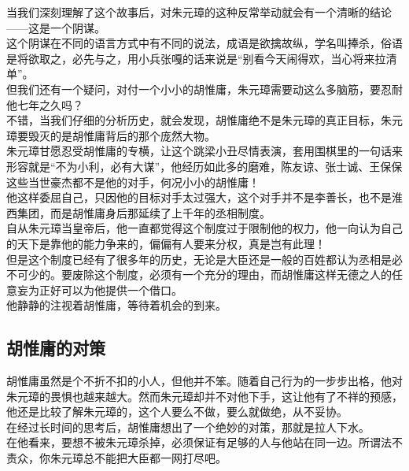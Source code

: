 \begin{multicols}{\theparacolNo}
当我们深刻理解了这个故事后，对朱元璋的这种反常举动就会有一个清晰的结论——这是一个阴谋。\\

这个阴谋在不同的语言方式中有不同的说法，成语是欲擒故纵，学名叫捧杀，俗语是将欲取之，必先与之，用小兵张嘎的话来说是“别看今天闹得欢，当心将来拉清单”。\\

但我们还有一个疑问，对付一个小小的胡惟庸，朱元璋需要动这么多脑筋，要忍耐他七年之久吗？\\

不错，当我们仔细的分析历史，就会发现，胡惟庸绝不是朱元璋的真正目标，朱元璋要毁灭的是胡惟庸背后的那个庞然大物。\\

朱元璋甘愿忍受胡惟庸的专横，让这个跳梁小丑尽情表演，套用围棋里的一句话来形容就是“不为小利，必有大谋”，他经历如此多的磨难，陈友谅、张士诚、王保保这些当世豪杰都不是他的对手，何况小小的胡惟庸！\\

他这样委屈自己，只因他的目标对手太过强大，这个对手并不是李善长，也不是淮西集团，而是胡惟庸身后那延续了上千年的丞相制度。\\

自从朱元璋当皇帝后，他一直都觉得这个制度过于限制他的权力，他一向认为自己的天下是靠他的能力争来的，偏偏有人要来分权，真是岂有此理！\\

但是这个制度已经有了很多年的历史，无论是大臣还是一般的百姓都认为丞相是必不可少的。要废除这个制度，必须有一个充分的理由，而胡惟庸这样无德之人的任意妄为正好可以为他提供一个借口。\\

他静静的注视着胡惟庸，等待着机会的到来。\\

\subsection{胡惟庸的对策}
胡惟庸虽然是个不折不扣的小人，但他并不笨。随着自己行为的一步步出格，他对朱元璋的畏惧也越来越大。然而朱元璋却并不对他下手，这让他有了不祥的预感，他还是比较了解朱元璋的，这个人要么不做，要么就做绝，从不妥协。\\

在经过长时间的思考后，胡惟庸想出了一个绝妙的对策，那就是拉人下水。\\

在他看来，要想不被朱元璋杀掉，必须保证有足够的人与他站在同一边。所谓法不责众，你朱元璋总不能把大臣都一网打尽吧。\\


\end{multicols}
